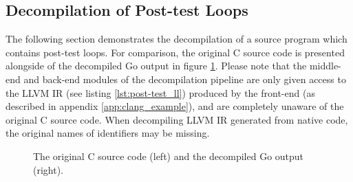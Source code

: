 
\subsection{Decompilation of Post-test Loops}
\label{app:decompilation_of_post-test_loops}

The following section demonstrates the decompilation of a source program which contains post-test loops. For comparison, the original C source code is presented alongside of the decompiled Go output in figure \ref{fig:post-test_comparison}. Please note that the middle-end and back-end modules of the decompilation pipeline are only given access to the LLVM IR (see listing \ref{lst:post-test_ll}) produced by the front-end (as described in appendix \ref{app:clang_example}), and are completely unaware of the original C source code. When decompiling LLVM IR generated from native code, the original names of identifiers may be missing.

\begin{figure}[htbp]
	\centering
	\begin{subfigure}[t]{0.49\textwidth}
		
	\end{subfigure}
	\qquad
	\begin{subfigure}[t]{0.31\textwidth}
		
	\end{subfigure}
	\caption{The original C source code (left) and the decompiled Go output (right).}
	\label{fig:post-test_comparison}
\end{figure}


